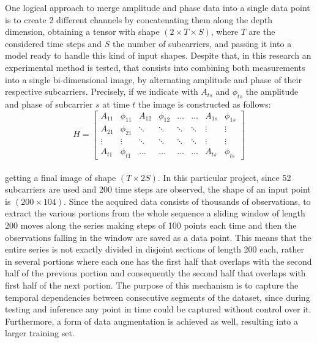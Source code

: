 \documentclass[binding=0.7cm, oneside]{sapthesis}
\begin{document}
One logical approach to merge amplitude and phase data into a single data point is to create 2 different channels by concatenating them along the depth dimension, obtaining a tensor with shape $( 2 \times T \times S)$, where $T$ are the considered
time steps and $S$ the number of subcarriers, and passing it into a model ready to handle this kind of input shapes. Despite that, in this research an experimental method is tested, that consists into combining both measurements into a single
bi-dimensional image, by alternating amplitude and phase of their respective subcarriers. Precisely, if we indicate with $A_{ts}$ and $\phi_{ts}$ the amplitude and phase of subcarrier $s$ at time $t$ the image is constructed as follows:
\\
\[
    H = \begin{bmatrix}
        A_{11} & \phi_{11} & A_{12} & \phi_{12} & \dots  & \dots  & A_{1s} & \phi_{1s} \\
        A_{21} & \phi_{21} & \ddots & \ddots    & \ddots & \ddots & \vdots & \vdots    \\
        \vdots & \vdots    & \ddots & \ddots    & \ddots & \ddots & \vdots & \vdots    \\
        A_{t1} & \phi_{t1} & \dots  & \dots     & \dots  & \dots  & A_{ts} & \phi_{ts}
    \end{bmatrix}
\]
\\
getting a final image of shape $(T \times 2S)$. In this particular project, since 52 subcarriers are used and 200 time steps are observed, the shape of an input point is $(200 \times 104)$.
Since the acquired data consists of thousands of observations, to extract the various portions from the whole sequence a sliding window of length 200 moves along the series making steps of 100 points each time
and then the observations falling in the window are saved as a data point. This means that the entire series is not exactly divided in disjoint sections of length 200 each, rather in several portions where each one has the first half that overlaps with the
second half of the previous portion and consequently the second half that overlaps with first half of the next portion. The purpose of this mechanism is to capture the temporal dependencies between consecutive segments of the dataset, since during testing and inference
any point in time could be captured without control over it. Furthermore, a form of data augmentation is achieved as well, resulting into a larger training set.


\end{document}
